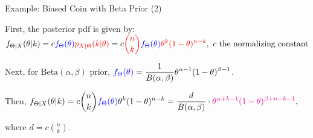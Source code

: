 \begin{frame}{Example: Biased Coin with Beta Prior (2)}


\plitemsep 0.07in
\bci

\item[] 
  \bce[(a)]
\item   First, the posterior pdf is given by:
$\displaystyle f_{\Theta | X}(\theta | k) = c {\color{blue} f_\Theta(\theta)} {\color{red} p_{X|\Theta}(k | \theta)}= c {\color{red} {n \choose k}} {\color{blue} f_\Theta(\theta)} {\color{red} \theta^k(1-\theta)^{n-k}}, \ \text{$c$ the normalizing constant}
$

\item Next, for $\displaystyle \text{Beta}(\alpha,\beta)$ prior,
$\displaystyle {\color{blue} \ensuremath{f_\Theta(\theta)}} = \frac{1}{B(\alpha,\beta)}\theta^{\alpha-1} (1-\theta)^{\beta
  -1}$.

\item 
Then, 
$
\displaystyle f_{\Theta|X}(\theta|k)= c {n \choose k} {\color{blue} f_\Theta(\theta)} \theta^k(1-\theta)^{n-k} = \frac{d}{B(\alpha,\beta)} \cdot {\color{magenta} \theta^{\alpha+k-1}(1-\theta)^{\beta + n-k -1}},
$

where $d = c{n \choose k}.$
  \ece
\eci

\end{frame}





